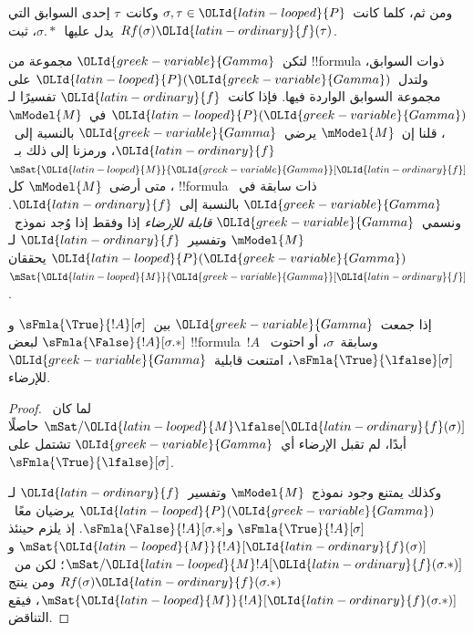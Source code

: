 \documentclass[../../../include/open-logic-section]{subfiles}
\begin{document}
ومن ثم، كلما كانت~$\sigma,\tau\in {\OLId{latin-looped}{P}}$ وكانت~$\tau$ إحدى السوابق التي
يدل عليها~$\sigma.{*}$، ثبت~$Rf(\sigma){\OLId{latin-ordinary}{f}}(\tau)$.

\begin{defn}
  لتكن~${\OLId{greek-variable}{Gamma}}$ مجموعة من !!{formula} ذوات السوابق، ولتدل~${\OLId{latin-looped}{P}}({\OLId{greek-variable}{Gamma}})$
  على مجموعة السوابق الواردة فيها. فإذا كانت~${\OLId{latin-ordinary}{f}}$ تفسيرًا لـ${\OLId{latin-looped}{P}}({\OLId{greek-variable}{Gamma}})$
  في~$\mModel{M}$، قلنا إن~$\mModel{M}$ يرضي~${\OLId{greek-variable}{Gamma}}$ بالنسبة إلى~${\OLId{latin-ordinary}{f}}$،
  ورمزنا إلى ذلك بـ~$\mSat{{\OLId{latin-looped}{M}}}{{\OLId{greek-variable}{Gamma}}}[{\OLId{latin-ordinary}{f}}]$، متى أرضى~$\mModel{M}$ كل
  !!{formula} ذات سابقة في~${\OLId{greek-variable}{Gamma}}$ بالنسبة إلى~${\OLId{latin-ordinary}{f}}$. ونسمي~${\OLId{greek-variable}{Gamma}}$
  \emph{قابلة للإرضاء} إذا وفقط إذا وُجد نموذج~$\mModel{M}$ وتفسير~${\OLId{latin-ordinary}{f}}$
  لـ${\OLId{latin-looped}{P}}({\OLId{greek-variable}{Gamma}})$ يحققان~$\mSat{{\OLId{latin-looped}{M}}}{{\OLId{greek-variable}{Gamma}}}[{\OLId{latin-ordinary}{f}}]$.
\end{defn}

\begin{prop}
  إذا جمعت~${\OLId{greek-variable}{Gamma}}$ بين~$\sFmla{\True}{!A}[\sigma]$
  و$\sFmla{\False}{!A}[\sigma.{*}]$ لبعض !!{formula}~$!A$
  وسابقة~$\sigma$، أو احتوت~$\sFmla{\True}{\lfalse}[\sigma]$،
  امتنعت قابلية~${\OLId{greek-variable}{Gamma}}$ للإرضاء.
\end{prop}

\begin{proof}
  لما كان~$\mSat/{{\OLId{latin-looped}{M}}}{\lfalse}[{\OLId{latin-ordinary}{f}}(\sigma)]$ حاصلًا أبدًا، لم تقبل
  الإرضاء أي~${\OLId{greek-variable}{Gamma}}$ تشتمل على~$\sFmla{\True}{\lfalse}[\sigma]$.

  وكذلك يمتنع وجود نموذج~$\mModel{M}$ وتفسير~${\OLId{latin-ordinary}{f}}$ لـ${\OLId{latin-looped}{P}}({\OLId{greek-variable}{Gamma}})$
  يرضيان معًا~$\sFmla{\True}{!A}[\sigma]$
  و$\sFmla{\False}{!A}[\sigma.{*}]$. إذ يلزم حينئذ
  $\mSat{{\OLId{latin-looped}{M}}}{!A}[{\OLId{latin-ordinary}{f}}(\sigma)]$ و$\mSat/{{\OLId{latin-looped}{M}}}{!A}[{\OLId{latin-ordinary}{f}}(\sigma.{*})]$؛
  لكن من~$Rf(\sigma){\OLId{latin-ordinary}{f}}(\sigma.{*})$ ومن
   ينتج
  $\mSat{{\OLId{latin-looped}{M}}}{!A}[{\OLId{latin-ordinary}{f}}(\sigma.{*})]$، فيقع التناقض.
\end{proof}
\end{document}
